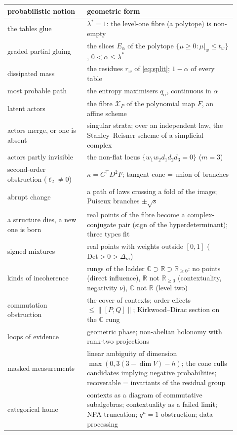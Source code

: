 \documentclass[11pt]{article}
\theoremstyle{definition}\newtheorem{definition}[theorem]{Definition}\newtheorem{remark}[theorem]{Remark}\newtheorem{example}[theorem]{Example}
\newcommand{\R}{\mathbb R}
\begin{document}
\begin{table}[!htbp]\centering\small
\begin{tabular}{p{0.32\linewidth}p{0.6\linewidth}}\toprule
probabilistic notion & geometric form\\\midrule
the tables glue & $\lambda^*=1$: the level-one fibre (a polytope) is non-empty\\
graded partial gluing & the slices $E_\alpha$ of the polytope $\{\mu\ge0:\mu|_w\le t_w\}$, $0<\alpha\le\lambda^*$\\
dissipated mass & the residues $r_w$ of \eqref{eq:split}; $1-\alpha$ of every table\\
most probable path & the entropy maximisers $q_\alpha$, continuous in $\alpha$\\
latent actors & the fibre $\mathcal X_P$ of the polynomial map $F$, an affine scheme\\
actors merge, or one is absent & singular strata; over an independent law, the Stanley--Reisner scheme of a simplicial complex\\
actors partly invisible & the non-flat locus $\{w_1w_2d_1d_2d_3=0\}$ ($m=3$)\\
second-order obstruction ($\ell_2\neq0$) & $\kappa=C^\top D^2F$; tangent cone = union of branches\\
abrupt change & a path of laws crossing a fold of the image; Puiseux branches $\pm\sqrt s$\\
a structure dies, a new one is born & real points of the fibre become a complex-conjugate pair (sign of the hyperdeterminant); three types fit\\
signed mixtures & real points with weights outside $[0,1]$ ($\mathrm{Det}>0>\Delta_m$)\\
kinds of incoherence & rungs of the ladder $\mathbb C\supset\R\supset\R_{\ge0}$: no points (direct influence), $\R$ not $\R_{\ge0}$ (contextuality, negativity $\nu$), $\mathbb C$ not $\R$ (level two)\\
commutation obstruction & the cover of contexts; order effects $\le\|[P,Q]\|$; Kirkwood--Dirac section on the $\mathbb C$ rung\\
loops of evidence & geometric phase; non-abelian holonomy with rank-two projections\\
masked measurements & linear ambiguity of dimension $\max(0,3(3-\dim V)-h)$; the cone culls candidates implying negative probabilities; recoverable = invariants of the residual group\\
categorical home & contexts as a diagram of commutative subalgebras; contextuality as a failed limit; NPA truncation; $q^n=1$ obstruction; data processing\\

\end{tabular}
\end{table}
\end{document}

